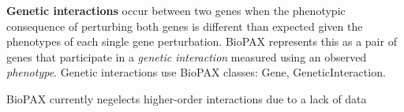 \begin{frame}
\begin{block}{\textbf{Genetic interactions}}
occur between two genes when the phenotypic consequence of perturbing both genes is different than expected given the phenotypes of each single gene perturbation. BioPAX represents this as a pair of genes that participate in a {\it genetic interaction} measured using an observed {\it phenotype}. Genetic interactions use BioPAX classes: Gene, GeneticInteraction.
\end{block}
\begin{block}{}
BioPAX currently negelects higher-order interactions due to a lack of data
\end{block}
\end{frame}
